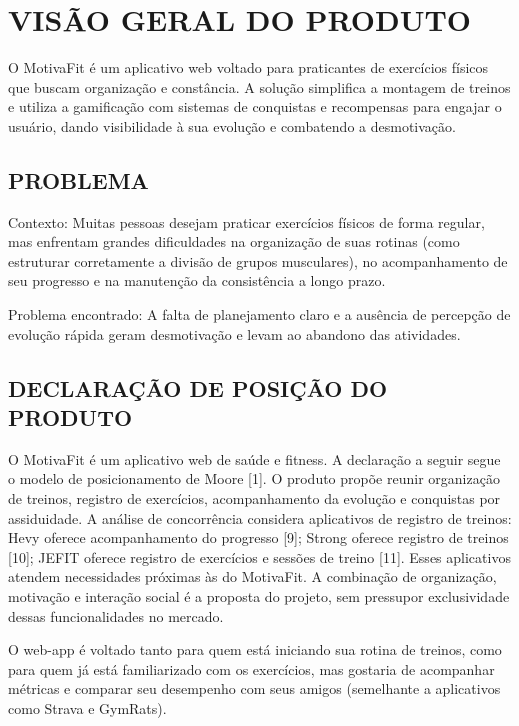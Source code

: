 \clearpage
\section{VISÃO GERAL DO PRODUTO}

O MotivaFit é um aplicativo web voltado para praticantes de exercícios físicos que buscam organização e constância. A solução simplifica a montagem de treinos e utiliza a gamificação com sistemas de conquistas e recompensas para engajar o usuário, dando visibilidade à sua evolução e combatendo a desmotivação.

\subsection{PROBLEMA}

Contexto: Muitas pessoas desejam praticar exercícios físicos de forma regular, mas enfrentam grandes dificuldades na organização de suas rotinas (como estruturar corretamente a divisão de grupos musculares), no acompanhamento de seu progresso e na manutenção da consistência a longo prazo.

Problema encontrado: A falta de planejamento claro e a ausência de percepção de evolução rápida geram desmotivação e levam ao abandono das atividades.

\subsection{DECLARAÇÃO DE POSIÇÃO DO PRODUTO}

O MotivaFit é um aplicativo web de saúde e fitness. A declaração a seguir segue o modelo de posicionamento de Moore [1]. O produto propõe reunir organização de treinos, registro de exercícios, acompanhamento da evolução e conquistas por assiduidade. A análise de concorrência considera aplicativos de registro de treinos: Hevy oferece acompanhamento do progresso [9]; Strong oferece registro de treinos [10]; JEFIT oferece registro de exercícios e sessões de treino [11]. Esses aplicativos atendem necessidades próximas às do MotivaFit. A combinação de organização, motivação e interação social é a proposta do projeto, sem pressupor exclusividade dessas funcionalidades no mercado.

O web-app é voltado tanto para quem está iniciando sua rotina de treinos, como para quem já está familiarizado com os exercícios, mas gostaria de acompanhar métricas e comparar seu desempenho com seus amigos (semelhante a aplicativos como Strava e GymRats).

